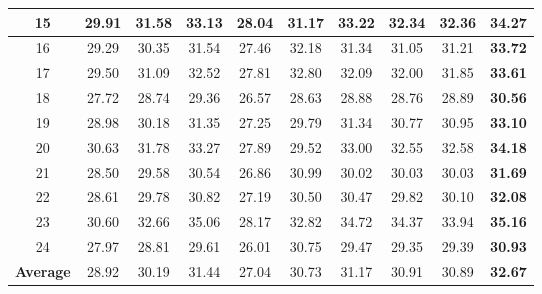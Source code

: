 \documentclass[10pt,onecolumn,letterpaper]{article}
\begin{document}
\begin{table}
\begin{center}
\begin{tabular}{|c||c|c|c|c|c|c|c|c|c|}
\hline
15 & 29.91 & 31.58 & 33.13 & 28.04 & 31.17 & 33.22 & 32.34 & 32.36 & \textbf{34.27}
\\
\hline
16 & 29.29 & 30.35 & 31.54 & 27.46 & 32.18 & 31.34 & 31.05 & 31.21 & \textbf{33.72}
\\
\hline
17 & 29.50 & 31.09 & 32.52 & 27.81 & 32.80 & 32.09 & 32.00 & 31.85 & \textbf{33.61}
\\
\hline
18 & 27.72 & 28.74 & 29.36 & 26.57 & 28.63 & 28.88 & 28.76 & 28.89 & \textbf{30.56}
\\
\hline
19 & 28.98 & 30.18 & 31.35 & 27.25 & 29.79 & 31.34 & 30.77 & 30.95 & \textbf{33.10}
\\
\hline
20 & 30.63 & 31.78 & 33.27 & 27.89 & 29.52 & 33.00 & 32.55 & 32.58 & \textbf{34.18}
\\
\hline
21 & 28.50 & 29.58 & 30.54 & 26.86 & 30.99 & 30.02 & 30.03 & 30.03 & \textbf{31.69}
\\
\hline
22 & 28.61 & 29.78 & 30.82 & 27.19 & 30.50 & 30.47 & 29.82 & 30.10 & \textbf{32.08}
\\
\hline
23 & 30.60 & 32.66 & 35.06 & 28.17 & 32.82 & 34.72 & 34.37 & 33.94 & \textbf{35.16}
\\
\hline
24 & 27.97 & 28.81 & 29.61 & 26.01 & 30.75 & 29.47 & 29.35 & 29.39 & \textbf{30.93}
\\
\hline
\textbf{Average} & 28.92 & 30.19 & 31.44 & 27.04 & 30.73 & 31.17 & 30.91 & 30.89 & \textbf{32.67}
\\
\hline
\end{tabular}
\end{center}
\vspace{-1mm}
\end{table}
\end{document}
